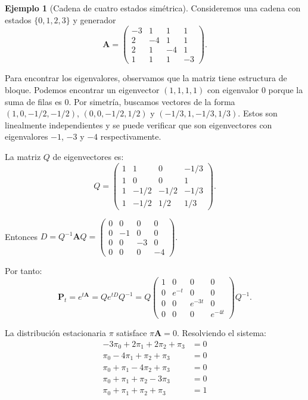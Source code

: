 \documentclass{article}
\theoremstyle{plain}
\theoremstyle{definition}
\newtheorem{Ejemplo}[Teorema]{Ejemplo}
\newcommand{\A}{\mathbf{A}}
\newcommand{\PP}{\mathbf{P}}
\begin{document}
\begin{Ejemplo}[Cadena de cuatro estados simétrica]
  Consideremos una cadena con estados $\{0,1,2,3\}$ y generador
  \[ \A = \begin{pmatrix}
    -3 & 1 & 1 & 1 \\
    2 & -4 & 1 & 1 \\
    2 & 1 & -4 & 1 \\
    1 & 1 & 1 & -3
  \end{pmatrix}. \]
  
  Para encontrar los eigenvalores, observamos que la matriz tiene estructura de bloque. Podemos encontrar un eigenvector $(1,1,1,1)$ con eigenvalor 0 porque la suma de filas es 0. Por simetr\'ia, buscamos vectores de la forma $(1,0,-1/2,-1/2)$, $(0,0,-1/2,1/2)$ y $(-1/3,1,-1/3,1/3)$. Estos son linealmente independientes y se puede verificar que son eigenvectores con eigenvalores $-1$, $-3$ y $-4$ respectivamente.
  
  La matriz $Q$ de eigenvectores es:
  \[ Q = \begin{pmatrix}
    1 & 1 & 0 & -1/3 \\
    1 & 0 & 0 & 1 \\
    1 & -1/2 & -1/2 & -1/3 \\
    1 & -1/2 & 1/2 & 1/3
  \end{pmatrix}. \]
  
  Entonces $D = Q^{-1}\A Q = \begin{pmatrix}
    0 & 0 & 0 & 0 \\
    0 & -1 & 0 & 0 \\
    0 & 0 & -3 & 0 \\
    0 & 0 & 0 & -4
  \end{pmatrix}$.
  
  Por tanto:
  \[ \PP_t = e^{t\A} = Q e^{tD} Q^{-1} = Q \begin{pmatrix}
    1 & 0 & 0 & 0 \\
    0 & e^{-t} & 0 & 0 \\
    0 & 0 & e^{-3t} & 0 \\
    0 & 0 & 0 & e^{-4t}
  \end{pmatrix} Q^{-1}. \]
  
  La distribuci\'on estacionaria $\pi$ satisface $\pi\A = 0$. Resolviendo el sistema:
  \begin{align*}
    -3\pi_0 + 2\pi_1 + 2\pi_2 + \pi_3 &= 0 \\
    \pi_0 - 4\pi_1 + \pi_2 + \pi_3 &= 0 \\
    \pi_0 + \pi_1 - 4\pi_2 + \pi_3 &= 0 \\
    \pi_0 + \pi_1 + \pi_2 - 3\pi_3 &= 0 \\
    \pi_0 + \pi_1 + \pi_2 + \pi_3 &= 1
  \end{align*}
  

\end{Ejemplo}
\end{document}
